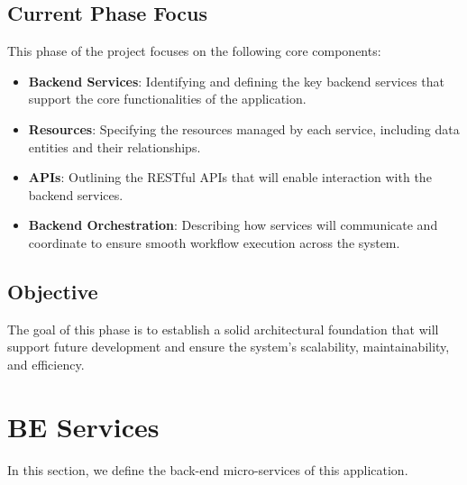 \documentclass[a4paper,12pt]{article}
\begin{document}
    \subsection{Current Phase Focus}
    This phase of the project focuses on the following core components:
    \begin{itemize}
        \item \textbf{Backend Services}: Identifying and defining the key backend services that support the core functionalities of the application.
        \item \textbf{Resources}: Specifying the resources managed by each service, including data entities and their relationships.
        \item \textbf{APIs}: Outlining the RESTful APIs that will enable interaction with the backend services.
        \item \textbf{Backend Orchestration}: Describing how services will communicate and coordinate to ensure smooth workflow execution across the system.
    \end{itemize}
    
    \subsection{Objective}
    The goal of this phase is to establish a solid architectural foundation that will support future development and ensure the system's scalability, maintainability, and efficiency.

\clearpage %

\section{BE Services}
In this section, we define the back-end micro-services of this application.
\end{document}
